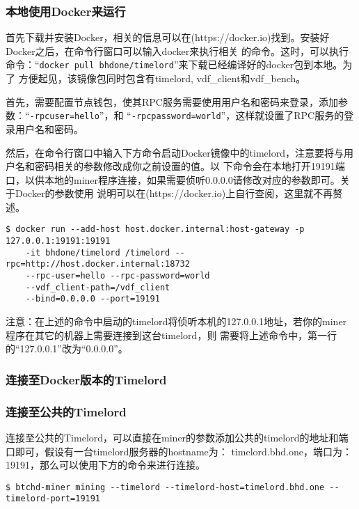 \begin{flushleft}
\subsubsection{本地使用Docker来运行}
\begin{flushleft}
    首先下载并安装Docker，相关的信息可以在(https://docker.io)找到。安装好Docker之后，在命令行窗口可以输入docker来执行相关
    的命令。这时，可以执行命令：``\texttt{docker pull bhdone/timelord}''来下载已经编译好的docker包到本地。为了
    方便起见，该镜像包同时包含有timelord, vdf\_client和vdf\_bench。
\end{flushleft}
\begin{flushleft}
    首先，需要配置节点钱包，使其RPC服务需要使用用户名和密码来登录，添加参数：``\texttt{-rpcuser=hello}''，和
    ``\texttt{-rpcpassword=world}''，这样就设置了RPC服务的登录用户名和密码。
\end{flushleft}
\begin{flushleft}
    然后，在命令行窗口中输入下方命令启动Docker镜像中的timelord，注意要将与用户名和密码相关的参数修改成你之前设置的值。以
    下命令会在本地打开19191端口，以供本地的miner程序连接，如果需要侦听0.0.0.0请修改对应的参数即可。关于Docker的参数使用
    说明可以在(https://docker.io)上自行查阅，这里就不再赘述。
\end{flushleft}
\scriptsize
\begin{verbatim}
$ docker run --add-host host.docker.internal:host-gateway -p 127.0.0.1:19191:19191
    -it bhdone/timelord /timelord --rpc=http://host.docker.internal:18732
    --rpc-user=hello --rpc-password=world
    --vdf_client-path=/vdf_client
    --bind=0.0.0.0 --port=19191
\end{verbatim}
\normalsize
\begin{flushleft}
    注意：在上述的命令中启动的timelord将侦听本机的127.0.0.1地址，若你的miner程序在其它的机器上需要连接到这台timelord，则
    需要将上述命令中，第一行的``127.0.0.1''改为``0.0.0.0''。
\end{flushleft}
\subsubsection{连接至Docker版本的Timelord}
\subsubsection{连接至公共的Timelord}
\begin{flushleft}
    连接至公共的Timelord，可以直接在miner的参数添加公共的timelord的地址和端口即可，假设有一台timelord服务器的hostname为：
    timelord.bhd.one，端口为：19191，那么可以使用下方的命令来进行连接。
\end{flushleft}
\scriptsize
\begin{verbatim}
$ btchd-miner mining --timelord --timelord-host=timelord.bhd.one --timelord-port=19191
\end{verbatim}
\normalsize

\end{flushleft}
